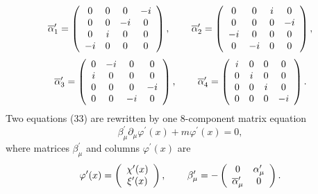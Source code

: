 \documentclass[a4paper,12pt]{article}
\begin{document}
\vspace{-7mm}
\begin{equation}
\label{34}
\end{equation}
\vspace{-7mm}
\[
\overline{\alpha }_1^{\prime }=\left(
\begin{array}{cccc}
0 & 0 & 0 & -i \\
0 & 0 & -i & 0 \\
0 & i & 0 & 0 \\
-i & 0 & 0 & 0
\end{array}
\right) ,\hspace{0.3in}
\overline{\alpha }_2^{\prime }=\left(
\begin{array}{cccc}
0 & 0 & i & 0 \\
0 & 0 & 0 & -i \\
-i & 0 & 0 & 0 \\
0 & -i & 0 & 0
\end{array}
\right) ,
\]
\[
\overline{\alpha }_3^{\prime }=\left(
\begin{array}{cccc}
0 & -i & 0 & 0 \\
i & 0 & 0 & 0 \\
0 & 0 & 0 & -i \\
0 & 0 & -i & 0
\end{array}
\right) , \hspace{0.3in}
\overline{\alpha }_4^{\prime }=\left(
\begin{array}{cccc}
i & 0 & 0 & 0 \\
0 & i & 0 & 0 \\
0 & 0 & i & 0 \\
0 & 0 & 0 & -i
\end{array}
\right) .
\]
Two equations (33) are rewritten by one 8-component matrix
equation
\begin{equation}
\beta _\mu ^{\prime }\partial _\mu \varphi ^{\prime }(x)+m\varphi
^{\prime }(x)=0 ,  \label{35}
\end{equation}
where matrices $\beta _\mu ^{\prime }$ and columns $\varphi
^{\prime }(x)$ are
\begin{equation}
\varphi ^{\prime }(x)=\left(
\begin{array}{c}
\chi ^{\prime }(x) \\
\xi ^{\prime }(x)
\end{array}
\right) ,\hspace{0.3in}\beta _\mu ^{\prime }=-\left(
\begin{array}{cc}
0 & \alpha _\mu ^{\prime } \\
\overline{\alpha }_\mu ^{\prime } & 0
\end{array}
\right) . \label{36}
\end{equation}
\end{document}
